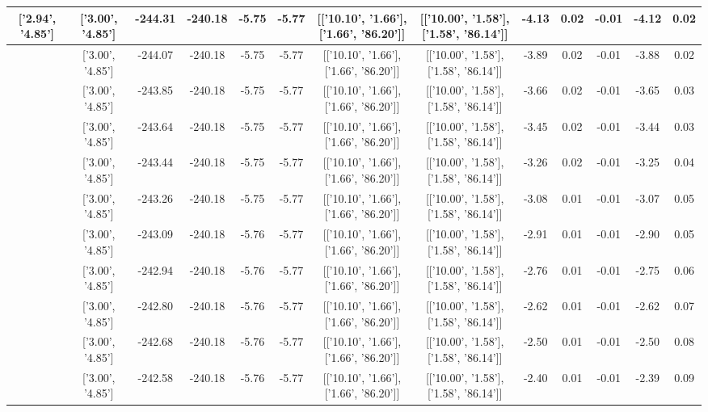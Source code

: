 \begin{table}[htbp]
\begin{adjustbox}{angle=90}
\begin{tabular}{|c|c|c|c|c|c|c|c|c|c|c|c|c|}
 ['2.94', '4.85'] & ['3.00', '4.85'] & -244.31 & -240.18 & -5.75 & -5.77 & [['10.10', '1.66'], ['1.66', '86.20']] & [['10.00', '1.58'], ['1.58', '86.14']] & -4.13 & 0.02 & -0.01 & -4.12 & 0.02\\ \hline
 ['2.94', '4.85'] & ['3.00', '4.85'] & -244.07 & -240.18 & -5.75 & -5.77 & [['10.10', '1.66'], ['1.66', '86.20']] & [['10.00', '1.58'], ['1.58', '86.14']] & -3.89 & 0.02 & -0.01 & -3.88 & 0.02\\ \hline
 ['2.94', '4.85'] & ['3.00', '4.85'] & -243.85 & -240.18 & -5.75 & -5.77 & [['10.10', '1.66'], ['1.66', '86.20']] & [['10.00', '1.58'], ['1.58', '86.14']] & -3.66 & 0.02 & -0.01 & -3.65 & 0.03\\ \hline
 ['2.95', '4.85'] & ['3.00', '4.85'] & -243.64 & -240.18 & -5.75 & -5.77 & [['10.10', '1.66'], ['1.66', '86.20']] & [['10.00', '1.58'], ['1.58', '86.14']] & -3.45 & 0.02 & -0.01 & -3.44 & 0.03\\ \hline
 ['2.95', '4.85'] & ['3.00', '4.85'] & -243.44 & -240.18 & -5.75 & -5.77 & [['10.10', '1.66'], ['1.66', '86.20']] & [['10.00', '1.58'], ['1.58', '86.14']] & -3.26 & 0.02 & -0.01 & -3.25 & 0.04\\ \hline
 ['2.96', '4.85'] & ['3.00', '4.85'] & -243.26 & -240.18 & -5.75 & -5.77 & [['10.10', '1.66'], ['1.66', '86.20']] & [['10.00', '1.58'], ['1.58', '86.14']] & -3.08 & 0.01 & -0.01 & -3.07 & 0.05\\ \hline
 ['2.96', '4.85'] & ['3.00', '4.85'] & -243.09 & -240.18 & -5.76 & -5.77 & [['10.10', '1.66'], ['1.66', '86.20']] & [['10.00', '1.58'], ['1.58', '86.14']] & -2.91 & 0.01 & -0.01 & -2.90 & 0.05\\ \hline
 ['2.96', '4.85'] & ['3.00', '4.85'] & -242.94 & -240.18 & -5.76 & -5.77 & [['10.10', '1.66'], ['1.66', '86.20']] & [['10.00', '1.58'], ['1.58', '86.14']] & -2.76 & 0.01 & -0.01 & -2.75 & 0.06\\ \hline
 ['2.97', '4.85'] & ['3.00', '4.85'] & -242.80 & -240.18 & -5.76 & -5.77 & [['10.10', '1.66'], ['1.66', '86.20']] & [['10.00', '1.58'], ['1.58', '86.14']] & -2.62 & 0.01 & -0.01 & -2.62 & 0.07\\ \hline
 ['2.97', '4.85'] & ['3.00', '4.85'] & -242.68 & -240.18 & -5.76 & -5.77 & [['10.10', '1.66'], ['1.66', '86.20']] & [['10.00', '1.58'], ['1.58', '86.14']] & -2.50 & 0.01 & -0.01 & -2.50 & 0.08\\ \hline
 ['2.97', '4.85'] & ['3.00', '4.85'] & -242.58 & -240.18 & -5.76 & -5.77 & [['10.10', '1.66'], ['1.66', '86.20']] & [['10.00', '1.58'], ['1.58', '86.14']] & -2.40 & 0.01 & -0.01 & -2.39 & 0.09\\ \hline

\end{tabular}
\end{adjustbox}
\end{table}
